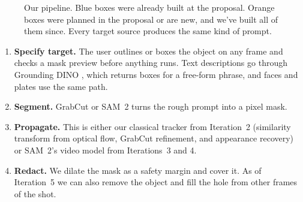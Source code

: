 \documentclass[10pt,letterpaper]{article}
\begin{document}
\begin{figure}[h]
\caption{Our pipeline. Blue boxes were already built at the proposal. Orange boxes were planned in
the proposal or are new, and we've built all of them since. Every target source produces the same
kind of prompt.}
\label{fig:pipeline}
\end{figure}

\begin{enumerate}
\item \textbf{Specify target.} The user outlines or boxes the object on any frame and checks a
mask preview before anything runs. Text descriptions go through Grounding DINO \cite{gdino}, which
returns boxes for a free-form phrase, and faces and plates use the same path.
\item \textbf{Segment.} GrabCut \cite{grabcut} or SAM~2 \cite{sam2} turns the rough prompt into a
pixel mask.
\item \textbf{Propagate.} This is either our classical tracker from Iteration~2 (similarity
transform from optical flow, GrabCut refinement, and appearance recovery) or SAM~2's video model
from Iterations~3 and 4.
\item \textbf{Redact.} We dilate the mask as a safety margin and cover it. As of Iteration~5 we can
also remove the object and fill the hole from other frames of the shot.
\end{enumerate}
\end{document}
